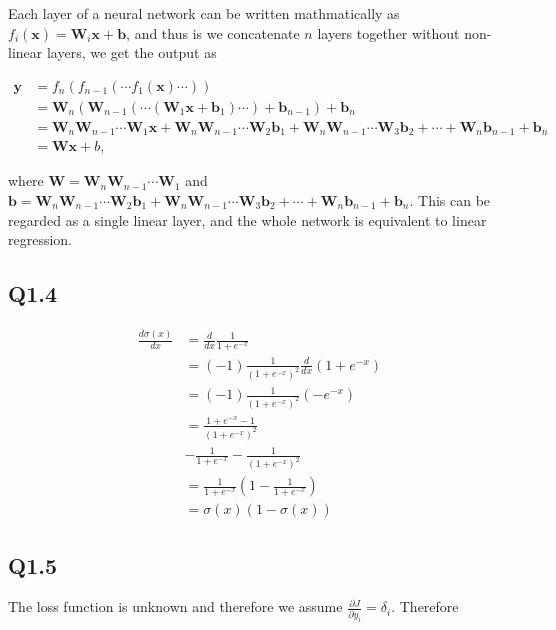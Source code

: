 \documentclass[11pt]{article}
\begin{document}
\newcommand{\bx} {\mathbf{x}}
\newcommand{\by} {\mathbf{y}}
\newcommand{\bW} {\mathbf{W}}
\newcommand{\bb} {\mathbf{b}}

Each layer of a neural network can be written mathmatically as $f_i(\bx)=\bW_i\bx+\bb$, and thus is we concatenate $n$ layers together without non-linear layers, we get the output as

\begin{align}
  \by &= f_n(f_{n-1}(\cdots f_1(\bx) \cdots)) \\
  &= \bW_n (\bW_{n-1} (\cdots(\bW_1\bx+\bb_1)\cdots) +\bb_{n-1}) + \bb_n \\
  &= \bW_n \bW_{n-1}\cdots \bW_1 \bx + \bW_n \bW_{n-1}\cdots \bW_2 \bb_1 + \bW_n \bW_{n-1}\cdots \bW_3 \bb_2 + \cdots + \bW_n\bb_{n-1} + \bb_n\\
  &= \bW\bx+b,
\end{align}

where $\bW = \bW_n \bW_{n-1}\cdots \bW_1$ and $\bb = \bW_n \bW_{n-1}\cdots \bW_2 \bb_1 + \bW_n \bW_{n-1}\cdots \bW_3 \bb_2 + \cdots + \bW_n\bb_{n-1} + \bb_n$. This can be regarded as a single linear layer, and the whole network is equivalent to linear regression.

\newpage

\subsection*{Q1.4}

\begin{align}
  \frac{d\sigma(x)}{dx} &= \frac{d}{dx}\frac{1}{1+e^{-x}} \\
  &= (-1)\frac{1}{(1+e^{-x})^2} \frac{d}{dx} (1+e^{-x}) \\
  &= (-1)\frac{1}{(1+e^{-x})^2} (-e^{-x}) \\
  &= \frac{1+e^{-x}-1}{(1+e^{-x})^2} \\
  &- \frac{1}{1+e^{-x}} - \frac{1}{(1+e^{-x})^2} \\
  &= \frac{1}{1+e^{-x}} (1-\frac{1}{1+e^{-x}}) \\
  &= \sigma(x) (1-\sigma(x))
\end{align}

\newpage
\subsection*{Q1.5}

\newcommand{\bdelta} {\mathbf{\delta}}

The loss function is unknown and therefore we assume $\frac{\partial J}{\partial y_i} = \delta_i$. Therefore
\end{document}
